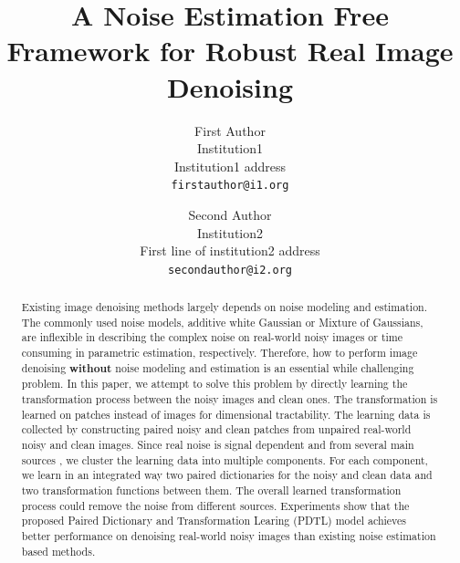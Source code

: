 \documentclass[10pt,twocolumn,letterpaper]{article}
\begin{document}
\title{A Noise Estimation Free Framework for Robust Real Image Denoising}

\author{First Author\\
Institution1\\
Institution1 address\\
{\tt\small firstauthor@i1.org}
\and
Second Author\\
Institution2\\
First line of institution2 address\\
{\tt\small secondauthor@i2.org}
}

\maketitle

\begin{abstract}
Existing image denoising methods largely depends on noise modeling and estimation. The commonly used noise models, additive white Gaussian or Mixture of Gaussians, are inflexible in describing the complex noise on real-world noisy images or time consuming in parametric estimation, respectively. Therefore, how to perform image denoising \textbf{without} noise modeling and estimation is an essential while challenging problem. In this paper, we attempt to solve this problem by directly learning the transformation process between the noisy images and clean ones. The transformation is learned on patches instead of images for dimensional tractability. The learning data is collected by constructing paired noisy and clean patches from unpaired real-world noisy and clean images. Since real noise is signal dependent and from several main sources \cite{healey1994radiometric}, we cluster the learning data into multiple components. For each component, we learn in an integrated way two paired dictionaries for the noisy and clean data and two transformation functions between them. The overall learned transformation process could remove the noise from different sources. Experiments show that the proposed Paired Dictionary and Transformation Learing (PDTL) model achieves better performance on denoising real-world noisy images than existing noise estimation based methods.
\end{abstract}
\end{document}
